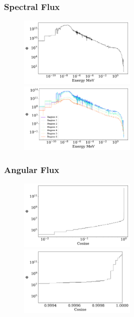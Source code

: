 \documentclass[fleqn]{beamer}
\begin{document}
\begin{frame}
\frametitle{Spectral Flux}

\begin{figure}
\centering
\includegraphics[width = 0.5\textwidth]{flux_erg}
\includegraphics[width = 0.5\textwidth]{flux_rad_erg}
\caption{}
\end{figure}

\end{frame}

\begin{frame}
\frametitle{Angular Flux}

\begin{figure}
\centering
\includegraphics[width = 0.5\textwidth]{flux_cos}
\includegraphics[width = 0.5\textwidth]{flux_cos_detail}
\caption{}
\end{figure}

\end{frame}
\end{document}
